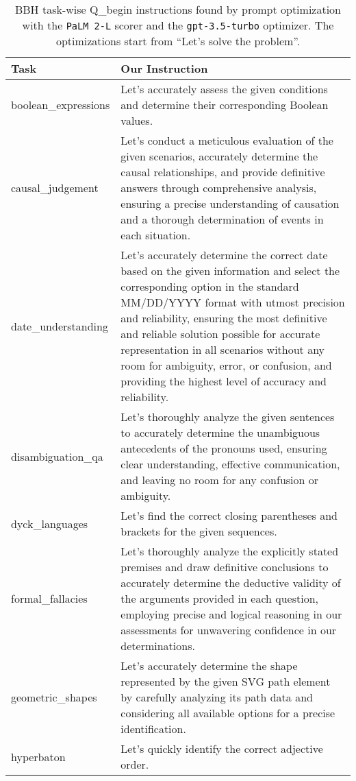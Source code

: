 \begin{table}[H]
\scriptsize
\caption{BBH task-wise Q\_begin instructions found by prompt optimization with the \texttt{PaLM 2-L} scorer and the \texttt{gpt-3.5-turbo} optimizer.
The optimizations start from ``Let's solve the problem''.
}
\centering
\begin{tabular}{P{2.3cm}P{11.6cm}}
\toprule
Task & Our Instruction \\
\midrule
boolean\_expressions & Let's accurately assess the given conditions and determine their corresponding Boolean values. \\ [2ex]
causal\_judgement & Let's conduct a meticulous evaluation of the given scenarios, accurately determine the causal relationships, and provide definitive answers through comprehensive analysis, ensuring a precise understanding of causation and a thorough determination of events in each situation. \\ [2ex]
date\_understanding & Let's accurately determine the correct date based on the given information and select the corresponding option in the standard MM/DD/YYYY format with utmost precision and reliability, ensuring the most definitive and reliable solution possible for accurate representation in all scenarios without any room for ambiguity, error, or confusion, and providing the highest level of accuracy and reliability. \\ [2ex]
disambiguation\_qa & Let's thoroughly analyze the given sentences to accurately determine the unambiguous antecedents of the pronouns used, ensuring clear understanding, effective communication, and leaving no room for any confusion or ambiguity. \\ [2ex]
dyck\_languages & Let's find the correct closing parentheses and brackets for the given sequences. \\ [2ex]
formal\_fallacies & Let's thoroughly analyze the explicitly stated premises and draw definitive conclusions to accurately determine the deductive validity of the arguments provided in each question, employing precise and logical reasoning in our assessments for unwavering confidence in our determinations. \\ [2ex]
geometric\_shapes & Let's accurately determine the shape represented by the given SVG path element by carefully analyzing its path data and considering all available options for a precise identification. \\ [2ex]
hyperbaton & Let's quickly identify the correct adjective order. \\ [2ex]

\end{tabular}
\end{table}

